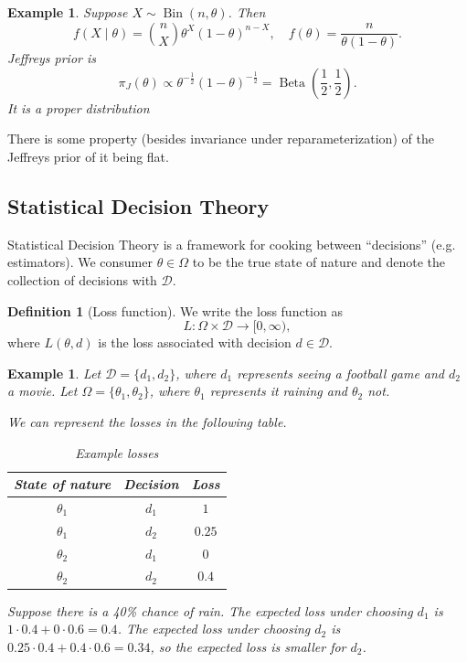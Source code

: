 \documentclass{tufte-handout}
\newtheorem{ex}[thm]{Example}
\theoremstyle{definition}
\newtheorem{defn}[thm]{Definition}
\begin{document}
\begin{ex}
	Suppose $X \sim  \operatorname{Bin}(n,\theta)$. Then \[
		f(X \mid \theta) = \binom{n}{X} \theta^{X} (1-\theta)^{n-X}, \quad f(\theta) = \frac{n}{\theta(1-\theta)}		
	.\] 
	Jeffreys prior is \[
		\pi_J(\theta) \propto \theta^{-\frac{1}{2}} (1-\theta)^{-\frac{1}{2}} = \operatorname{Beta}(\frac{1}{2},\frac{1}{2})
	.\] It is a proper distribution 
\end{ex}

There is some property (besides invariance under reparameterization) of the Jeffreys prior of it being flat. 

\subsection{Statistical Decision Theory}

Statistical Decision Theory is a framework for cooking between ``decisions'' (e.g. estimators). We consumer $\theta \in \Omega$ to be the true state of nature and denote the collection of decisions with $\mathscr{D}$.

\begin{defn}[Loss function]
	We write the loss function as\[
		L: \Omega \times \mathscr{D} \to [0,\infty),
	\] where $L(\theta,d)$ is the loss associated with decision $d \in \mathscr{D}$.
\end{defn}

\begin{ex}
	Let $\mathscr{D} = \{d_1,d_2\}$, where $d_1$ represents seeing a football game and $d_2$ a movie. Let $\Omega = \{\theta_1,\theta_2\}$, where $\theta_1$ represents it raining and $\theta_2$ not.

	We can represent the losses in the following table.
	\begin{table}[htpb]
		\centering
		\caption{Example losses}
		\label{tab:label}
		\begin{tabular}{ccc}
		State of nature & Decision & Loss \\ \hline
		$\theta_1$ & $d_1$ & $1$ \\
		$\theta_1$ & $d_2$ & $0.25$ \\
		$\theta_2$ & $d_1$ & $0$ \\
		$\theta_2$ & $d_2$ & $0.4$
		\end{tabular}
	\end{table}

	Suppose there is a 40\% chance of rain. The expected loss under choosing $d_1$ is $1\cdot 0.4 + 0 \cdot 0.6 = 0.4$. The expected loss under choosing $d_2$ is $0.25 \cdot 0.4 + 0.4 \cdot 0.6 = 0.34$, so the expected loss is smaller for $d_2$.
\end{ex}
\end{document}
